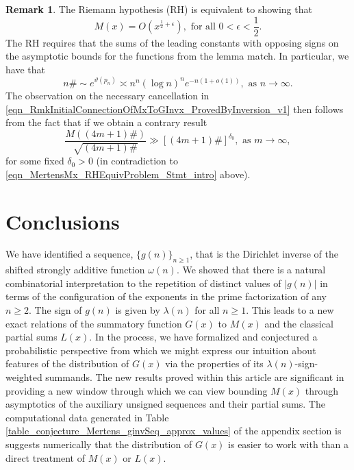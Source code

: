 \documentclass[11pt,reqno,a4letter]{article}
\newcommand{\hlocalref}[1]{\hyperref[#1]{\ref{#1}}}
\numberwithin{equation}{section}
\numberwithin{figure}{section}
\numberwithin{table}{section}
\theoremstyle{plain}
\numberwithin{theorem}{section}
\theoremstyle{definition}
\newtheorem{remark}[theorem]{Remark}
\begin{document}
\begin{remark}
\label{remark_LocalCancellationWithGxAlongThePrimorialsUnderTheRH} 
The Riemann hypothesis (RH) is equivalent to showing that 
\begin{equation} 
\label{eqn_MertensMx_RHEquivProblem_Stmt_intro} 
M(x) = O\left(x^{\frac{1}{2}+\epsilon}\right), \text{ for all } 0 < \epsilon < \frac{1}{2}.
\end{equation}
The RH requires that the sums of the leading constants with opposing signs 
on the asymptotic bounds for the functions from the lemma match. 
In particular, we have that 
\cite{DUSART-1999,DUSART-2010} 
\[
n\# \sim e^{\vartheta(p_n)} \asymp n^n (\log n)^n e^{-n(1+o(1))}, 
     \text{ as } n \rightarrow \infty. 
\]
The observation on the necessary cancellation in 
\eqref{eqn_RmkInitialConnectionOfMxToGInvx_ProvedByInversion_v1}
then follows from the fact that if we obtain a contrary result  
\[
\frac{M((4m+1)\#)}{\sqrt{(4m+1)\#}} \gg \left[(4m+1)\#\right]^{\delta_0}, 
     \text{ as } m \rightarrow \infty, 
\]
for some fixed $\delta_0 > 0$ 
(in contradiction to \eqref{eqn_MertensMx_RHEquivProblem_Stmt_intro} above). 
\end{remark}

\section{Conclusions}

We have identified a sequence, 
$\{g(n)\}_{n \geq 1}$, that is the Dirichlet inverse of the 
shifted strongly additive function $\omega(n)$. 
We showed that there is a natural 
combinatorial interpretation to the repetition of distinct values 
of $|g(n)|$ in terms of the configuration of the 
exponents in the prime factorization of any $n \geq 2$. 
The sign of $g(n)$ is given by $\lambda(n)$ for all $n \geq 1$. 
This leads to a new exact relations of the 
summatory function $G(x)$ to $M(x)$ and the classical partial sums $L(x)$. 
In the process, 
we have formalized and conjectured a probabilistic perspective from which we might express 
our intuition about features of the distribution of $G(x)$ 
via the properties of its $\lambda(n)$-sign-weighted summands.
The new results proved within this article 
are significant in providing a new window through which we can view bounding $M(x)$ 
through asymptotics of the auxiliary unsigned sequences and their partial sums. 
The computational data generated in 
Table \hlocalref{table_conjecture_Mertens_ginvSeq_approx_values} of the appendix section 
is suggests numerically that the distribution of $G(x)$ is easier to work with 
than a direct treatment of $M(x)$ or $L(x)$. 
\end{document}
